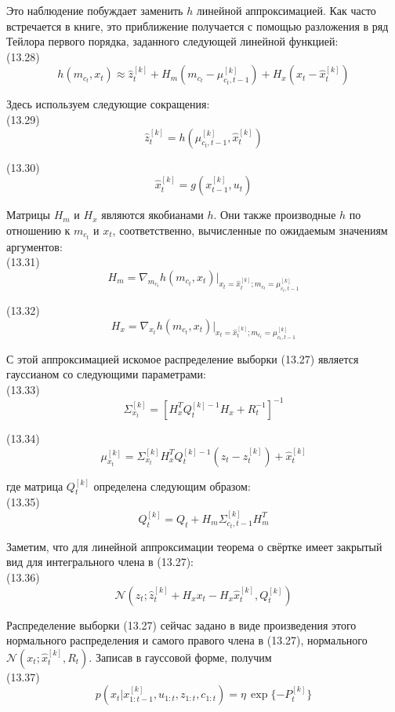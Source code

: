 \documentclass[10pt,a4paper]{article}
\begin{document}
Это наблюдение побуждает заменить $h$ линейной аппроксимацией. Как часто встречается в книге, это приближение получается с помощью разложения в ряд Тейлора первого порядка, заданного следующей линейной функцией:\\

(13.28)
$$h(m_{c_t},x_t)\approx\hat{z}_t^{[k]}+H_m(m_{c_t}-\mu_{c_t,t-1}^{[k]})+H_x(x_t-\hat{x}_t^{[k]})$$

Здесь используем следующие сокращения:\\

(13.29)
$$\hat{z}_t^{[k]}=h(\mu_{c_t,t-1}^{[k]},\hat{x}_t^{[k]})$$

(13.30)
$$\hat{x}_t^{[k]}=g(x_{t-1}^{[k]},u_t)$$

Матрицы $H_m$ и $H_x$ являются якобианами $h$. Они также производные $h$ по отношению к $m_{c_t}$ и $x_t$, соответственно, вычисленные по ожидаемым значениям аргументов:\\

(13.31)
$$H_m=\nabla_{m_{c_t}}h(m_{c_t},x_t)|_{x_t=\hat{x}_t^{[k]};m_{c_t}=\mu_{c_t,t-1}^{[k]}}$$

(13.32)
$$H_x=\nabla_{x_t}h(m_{c_t},x_t)|_{x_t=\hat{x}_t^{[k]};m_{c_t}=\mu_{c_t,t-1}^{[k]}}$$

С этой аппроксимацией искомое распределение выборки (13.27) является гауссианом со следующими параметрами:\\

(13.33)
$$\varSigma_{x_t}^{[k]}=[H_x^TQ_t^{[k]-1}H_x+R_t^{-1}]^{-1}$$

(13.34)
$$\mu_{x_t}^{[k]}=\varSigma_{x_t}^{[k]}H_x^TQ_t^{[k]-1}(z_t-\hat{z}_t^{[k]})+\hat{x}_t^{[k]}$$

где матрица $Q_t^{[k]}$ определена следующим образом:\\

(13.35)
$$Q_t^{[k]}=Q_t+H_m\varSigma_{c_t,t-1}^{[k]}H_m^T$$

Заметим, что для линейной аппроксимации теорема о свёртке имеет закрытый вид для интегрального члена в (13.27):\\

(13.36)
$$\mathcal{N}(z_t;\hat{z}_t^{[k]}+H_xx_t-H_x\hat{x}_t^{[k]},Q_t^{[k]})$$

Распределение выборки (13.27) сейчас задано в виде произведения этого нормального распределения и самого правого члена в (13.27), нормального  $\mathcal{N}(x_t;\hat{x}_t^{[k]},R_t)$. Записав в гауссовой форме, получим\\

(13.37)
$$p(x_t|x_{1:t-1}^{[k]},u_{1:t},z_{1:t},c_{1:t})=\eta\,\exp\{-P_t^{[k]}\}$$
\end{document}
